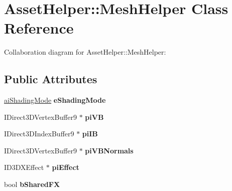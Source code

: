 \hypertarget{class_asset_helper_1_1_mesh_helper}{\section{Asset\+Helper\+:\+:Mesh\+Helper Class Reference}
\label{class_asset_helper_1_1_mesh_helper}
}


Collaboration diagram for Asset\+Helper\+:\+:Mesh\+Helper\+:
\subsection*{Public Attributes}
\begin{DoxyCompactItemize}
\item 
\hypertarget{class_asset_helper_1_1_mesh_helper_a67e996041ce5402fa2cde8b0f598683d}{\hyperlink{material_8h_a93e23e0201d6ed86fb4287e15218e4cf}{ai\+Shading\+Mode} {\bfseries e\+Shading\+Mode}}\label{class_asset_helper_1_1_mesh_helper_a67e996041ce5402fa2cde8b0f598683d}

\item 
\hypertarget{class_asset_helper_1_1_mesh_helper_a9d41fa925d1f902bf69a586e927f79dc}{I\+Direct3\+D\+Vertex\+Buffer9 $\ast$ {\bfseries pi\+V\+B}}\label{class_asset_helper_1_1_mesh_helper_a9d41fa925d1f902bf69a586e927f79dc}

\item 
\hypertarget{class_asset_helper_1_1_mesh_helper_a061fa0145ff4cb56bd3adc6e499969ef}{I\+Direct3\+D\+Index\+Buffer9 $\ast$ {\bfseries pi\+I\+B}}\label{class_asset_helper_1_1_mesh_helper_a061fa0145ff4cb56bd3adc6e499969ef}

\item 
\hypertarget{class_asset_helper_1_1_mesh_helper_a2973d1f0d41c2c4a676cd65f3810455d}{I\+Direct3\+D\+Vertex\+Buffer9 $\ast$ {\bfseries pi\+V\+B\+Normals}}\label{class_asset_helper_1_1_mesh_helper_a2973d1f0d41c2c4a676cd65f3810455d}

\item 
\hypertarget{class_asset_helper_1_1_mesh_helper_a17a3303cd3daa419d5f2a04d595ada45}{I\+D3\+D\+X\+Effect $\ast$ {\bfseries pi\+Effect}}\label{class_asset_helper_1_1_mesh_helper_a17a3303cd3daa419d5f2a04d595ada45}

\item 
\hypertarget{class_asset_helper_1_1_mesh_helper_a0249e74716c601c74fda6fcd8316dc24}{bool {\bfseries b\+Shared\+F\+X}}\label{class_asset_helper_1_1_mesh_helper_a0249e74716c601c74fda6fcd8316dc24}


\end{DoxyCompactItemize}
